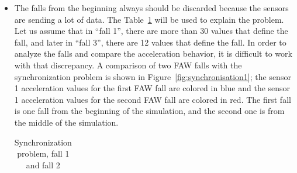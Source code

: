 \documentclass[review]{elsarticle}
\begin{document}
\begin{itemize}
 \item The falls from the beginning always should be discarded because the sensors are sending a lot of data. The Table~\ref{tabla:Synchro} will be used to explain the problem. Let us assume that in ``fall 1'', there are more than 30 values that define the fall, and later in ``fall 3'', there are 12 values that define the fall. In order to analyze the falls and compare the acceleration behavior, it is difficult to work with that discrepancy. A comparison of two FAW falls with the synchronization problem is shown in Figure~\ref{fig:synchronisation1}; the sensor 1 acceleration values for the first FAW fall are colored in blue and the sensor 1 acceleration values for the second FAW fall are colored in red. The first fall is one fall from the beginning of the simulation, and the second one is from the middle of the simulation.
 
 \begin{table}[!ht]
 \centering
 \begin{tabular}{*{5}{r}}
   
 \end{tabular}
 \caption{Synchronization problem, fall 1 and fall 2}%
 \label{tabla:Synchro}
 \end{table} 


\end{itemize}
\end{document}
